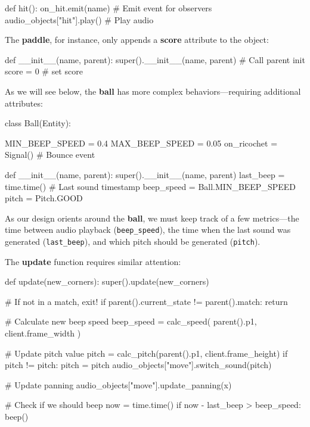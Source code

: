 \documentclass{report}
\newcommand{\pad}{\textbf{paddle}\xspace}
\newcommand{\ball}{\textbf{ball}\xspace}
\newcommand{\tech}[1]{\textbf{#1}}
\begin{document}
\begin{codeblock}
def hit():
    on_hit.emit(name) # Emit event for observers
    audio_objects["hit"].play() # Play audio
\end{codeblock}

The \pad, for instance, only appends a \tech{score} attribute to the object:

\begin{codeblock}
def __init__(name, parent):
    super().__init__(name, parent) # Call parent init
    score = 0 # set score
\end{codeblock}

As we will see below, the \ball has more complex behaviors---requiring additional attributes:

\begin{codeblock}
class Ball(Entity):

    MIN_BEEP_SPEED = 0.4
    MAX_BEEP_SPEED = 0.05
    on_ricochet = Signal() # Bounce event

    def __init__(name, parent):
        super().__init__(name, parent)
        last_beep = time.time() # Last sound timestamp
        beep_speed = Ball.MIN_BEEP_SPEED 
        pitch = Pitch.GOOD
\end{codeblock}

As our design orients around the \ball, we must keep track of a few metrics---the time between audio playback (\texttt{beep\_speed}), the time when the last sound was generated (\texttt{last\_beep}), and which pitch should be generated (\texttt{pitch}). 

The \tech{update} function requires similar attention:

\begin{codeblock}
def update(new_corners):
    super().update(new_corners)

    # If not in a match, exit!
    if parent().current_state != parent().match:
        return 

    # Calculate new beep speed
    beep_speed = calc_speed(
        parent().p1,  client.frame_width
    )

    # Update pitch value
    pitch = calc_pitch(parent().p1,  client.frame_height)
    if pitch != pitch:
        pitch = pitch
        audio_objects["move"].switch_sound(pitch)

    # Update panning
    audio_objects["move"].update_panning(x)

    # Check if we should beep
    now = time.time()
    if now - last_beep > beep_speed:
        beep()
\end{codeblock}
\end{document}
